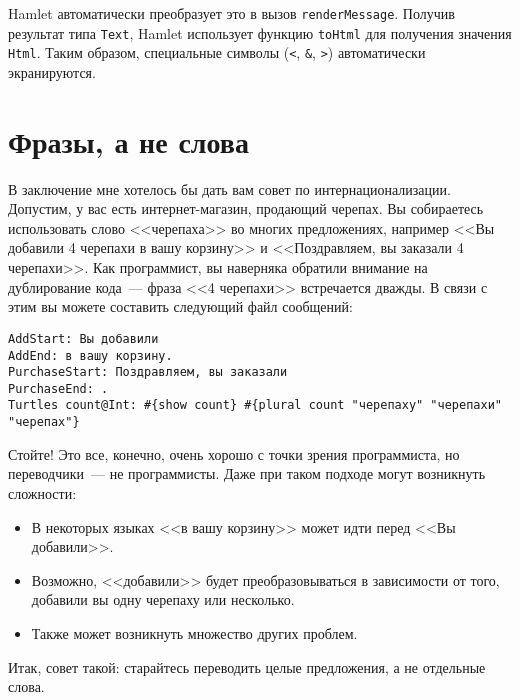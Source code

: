 Hamlet автоматически преобразует это в вызов \lstinline'renderMessage'. Получив
результат типа \lstinline'Text', Hamlet использует функцию \lstinline'toHtml'
для получения значения \lstinline'Html'. Таким образом, специальные символы
(\verb'<', \verb'&', \verb'>') автоматически экранируются.

\section{Фразы, а не слова} %

В заключение мне хотелось бы дать вам совет по интернационализации. Допустим, у
вас есть интернет-магазин, продающий черепах. Вы собираетесь использовать слово
<<черепаха>> во многих предложениях, например <<Вы добавили 4 черепахи в вашу
корзину>> и <<Поздравляем, вы заказали 4 черепахи>>. Как программист, вы
наверняка обратили внимание на дублирование кода~--- фраза <<4 черепахи>>
встречается дважды. В связи с этим вы можете составить следующий файл
сообщений:

\begin{lstlisting}
AddStart: Вы добавили
AddEnd: в вашу корзину.
PurchaseStart: Поздравляем, вы заказали
PurchaseEnd: .
Turtles count@Int: #{show count} #{plural count "черепаху" "черепахи" "черепах"}
\end{lstlisting}

Стойте! Это все, конечно, очень хорошо с точки зрения программиста, но
переводчики~--- не программисты. Даже при таком подходе могут возникнуть
сложности:

\begin{itemize}
  \item В некоторых языках <<в вашу корзину>> может идти перед <<Вы добавили>>.

  \item Возможно, <<добавили>> будет преобразовываться в зависимости от того,
      добавили вы одну черепаху или несколько.

  \item Также может возникнуть множество других проблем.
\end{itemize}

Итак, совет такой: старайтесь переводить целые предложения, а не отдельные
слова.
